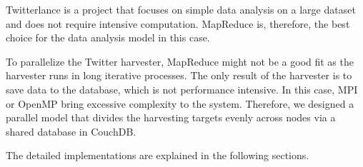 Twitterlance is a project that focuses on simple data analysis on a large dataset and does not require intensive computation. MapReduce is, therefore, the best choice for the data analysis model in this case. 

To parallelize the Twitter harvester, MapReduce might not be a good fit as the harvester runs in long iterative processes. The only result of the harvester is to save data to the database, which is not performance intensive. In this case, MPI or OpenMP bring excessive complexity to the system. Therefore, we designed a parallel model that divides the harvesting targets evenly across nodes via a shared database in CouchDB. 

The detailed implementations are explained in the following sections.   